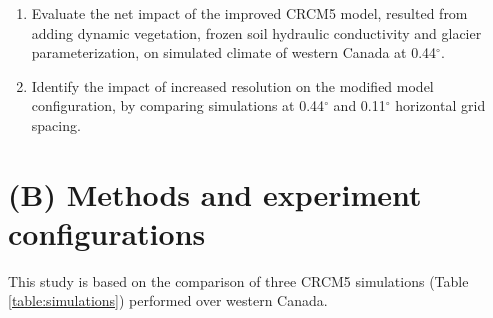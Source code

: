 \documentclass[a0b,landscape]{a0poster}
\begin{document}
\begin{multicols*}{4}
\vspace{1cm}
\begin{tcolorbox}[colback=white,colframe=green!40!black,adjusted title={Main objectives}]
  \begin{enumerate}
  \item Evaluate the net impact of the improved CRCM5 model, resulted from adding
        dynamic vegetation, frozen soil hydraulic conductivity and glacier
        parameterization, on simulated climate of western Canada at 0.44$^\circ$.
  \item Identify the impact of increased resolution on the modified model configuration,
        by comparing simulations at 0.44$^\circ$ and 0.11$^\circ$ horizontal grid
        spacing.
  \end{enumerate}
\end{tcolorbox}


\section*{(B) Methods and experiment configurations}
%
This study is based on the comparison of three CRCM5 simulations (Table \ref{table:simulations}) performed over western Canada.\\[1cm]
%


\end{multicols*}
\end{document}
